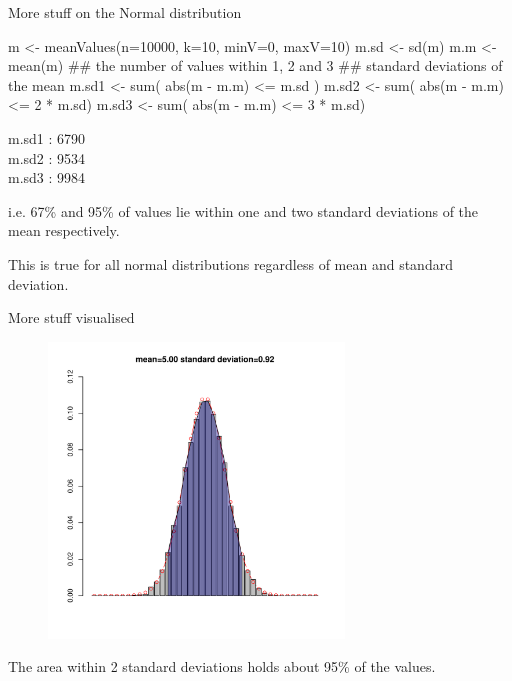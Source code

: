 \documentclass[pdf]{beamer}
\begin{document}
\begin{frame}[fragile]{More stuff on the Normal distribution}
  \begin{rcode}
    m <- meanValues(n=10000, k=10, minV=0, maxV=10)
    m.sd <- sd(m)
    m.m <- mean(m)
    ## the number of values within 1, 2 and 3 
    ## standard deviations of the mean
    m.sd1 <- sum( abs(m - m.m) <= m.sd )
    m.sd2 <- sum( abs(m - m.m) <= 2 * m.sd)
    m.sd3 <- sum( abs(m - m.m) <= 3 * m.sd)
  \end{rcode}

  m.sd1 : 6790\\
  m.sd2 : 9534\\
  m.sd3 : 9984

  i.e. 67\% and 95\% of values lie within one and two standard deviations of
  the mean respectively.

  This is true for all normal distributions regardless of mean and standard
  deviation.
\end{frame}

\begin{frame}{More stuff visualised}
  \begin{figure}[ht]
    \includegraphics[width=0.7\textwidth]{images/dist4}
  \end{figure}
  \vspace{-8ex}
  The area within 2 standard deviations holds about 95\% of the values.
\end{frame}
\end{document}
